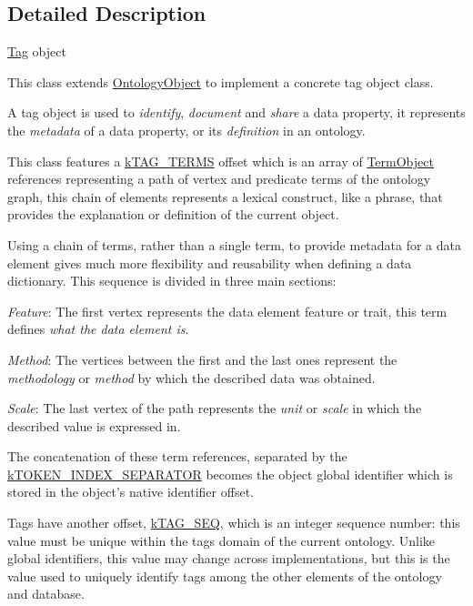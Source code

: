 \subsection{Detailed Description}
\hyperlink{class_ontology_wrapper_1_1_tag}{Tag} object

This class extends \hyperlink{class_ontology_wrapper_1_1_ontology_object}{Ontology\-Object} to implement a concrete tag object class.

A tag object is used to {\itshape identify}, {\itshape document} and {\itshape share} a data property, it represents the {\itshape metadata} of a data property, or its {\itshape definition} in an ontology.

This class features a \hyperlink{}{k\-T\-A\-G\-\_\-\-T\-E\-R\-M\-S} offset which is an array of \hyperlink{class_ontology_wrapper_1_1_term_object}{Term\-Object} references representing a path of vertex and predicate terms of the ontology graph, this chain of elements represents a lexical construct, like a phrase, that provides the explanation or definition of the current object.

Using a chain of terms, rather than a single term, to provide metadata for a data element gives much more flexibility and reusability when defining a data dictionary. This sequence is divided in three main sections\-:


\begin{DoxyItemize}
\item {\itshape Feature}\-: The first vertex represents the data element feature or trait, this term defines {\itshape what the data element is}. 
\item {\itshape Method}\-: The vertices between the first and the last ones represent the {\itshape methodology} or {\itshape method} by which the described data was obtained. 
\item {\itshape Scale}\-: The last vertex of the path represents the {\itshape unit} or {\itshape scale} in which the described value is expressed in. 
\end{DoxyItemize}

The concatenation of these term references, separated by the \hyperlink{}{k\-T\-O\-K\-E\-N\-\_\-\-I\-N\-D\-E\-X\-\_\-\-S\-E\-P\-A\-R\-A\-T\-O\-R} becomes the object global identifier which is stored in the object's native identifier offset.

Tags have another offset, \hyperlink{}{k\-T\-A\-G\-\_\-\-S\-E\-Q}, which is an integer sequence number\-: this value must be unique within the tags domain of the current ontology. Unlike global identifiers, this value may change across implementations, but this is the value used to uniquely identify tags among the other elements of the ontology and database.

